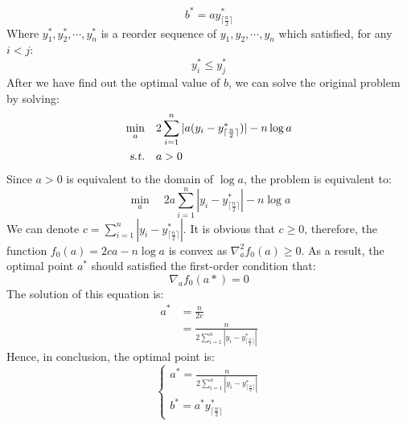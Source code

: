 \documentclass[10pt,a4paper]{article}
\begin{document}
\begin{equation*}
	b^{*} = a y^{*}_{\lceil \frac{n}{2} \rceil}
\end{equation*}
Where $y^{*}_{1}, y^{*}_{2}, \cdots, y^{*}_{n}$ is a reorder sequence of $y_{1}, y_{2}, \cdots, y_{n}$ which satisfied, for any $i < j$:
\begin{equation*}
	y^{*}_{i} \leq y^{*}_{j}
\end{equation*}
After we have find out the optimal value of $b$, we can solve the original problem by solving:
\begin{equation*}
	\begin{aligned}
		\displaystyle\min_{a} \quad & 2 \displaystyle\sum_{i = 1}^{n}|a(y_{i} - y^{*}_{\lceil \frac{n}{2} \rceil})| - n \log{a} \\
		\textsl{s.t.} \quad & a > 0
	\end{aligned}
\end{equation*}
Since $a > 0$ is equivalent to the domain of $\log{a}$, the problem is equivalent to:
\begin{equation*}
	\displaystyle\min_{a} \quad 2a \displaystyle\sum_{i = 1}^{n}|y_{i} - y^{*}_{\lceil \frac{n}{2} \rceil}| - n \log{a}
\end{equation*}
We can denote $c = \displaystyle\sum_{i = 1}^{n}|y_{i} - y^{*}_{\lceil \frac{n}{2} \rceil}|$. It is obvious that $c \geq 0$, therefore, the function $f_{0}(a) = 2ca - n \log{a}$ is convex as $\nabla_{a}^{2} f_{0}(a) \geq 0$. As a result, the optimal point $a^{*}$ should satisfied the first-order condition that:
\begin{equation*}
	\nabla_{a}f_{0}(a*) = 0
\end{equation*}
The solution of this equation is:
\begin{equation*}
	\begin{aligned}
		a^{*} &= \frac{n}{2c} \\
		&= \frac{n}{2 \displaystyle\sum_{i = 1}^{n}|y_{i} - y^{*}_{\lceil \frac{n}{2} \rceil}|}
	\end{aligned}
\end{equation*}
Hence, in conclusion, the optimal point is:
\begin{equation*}
	\begin{cases}
		a^{*} = \frac{n}{2 \displaystyle\sum_{i = 1}^{n}|y_{i} - y^{*}_{\lceil \frac{n}{2} \rceil}|} \\
		b^{*} = a^{*} y^{*}_{\lceil \frac{n}{2} \rceil}
	\end{cases}
\end{equation*}
\end{document}

